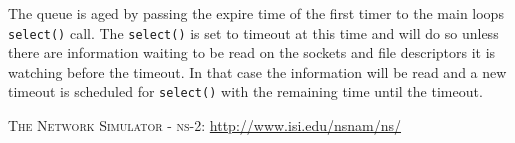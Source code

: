 \documentclass[swedish,10pt,twocolumn]{article}
\begin{document}
The queue is aged by passing the expire time of the first timer to the
main loops {\tt select()} call. The {\tt select()} is set to timeout
at this time and will do so unless there are information waiting to be
read on the sockets and file descriptors it is watching before the
timeout. In that case the information will be read and a new timeout
is scheduled for {\tt select()} with the remaining time until the
timeout.

\begin{thebibliography}
\small
\def\newblock{}

\textsc{The Network Simulator - ns-2:}
\newblock \url{http://www.isi.edu/nsnam/ns/}
\end{thebibliography}

\printindex
\end{document}
